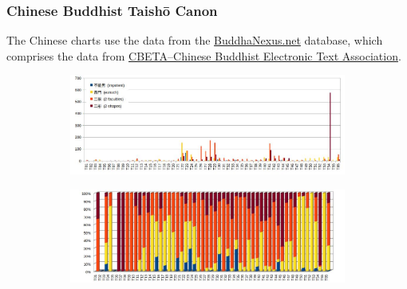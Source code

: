 \newpage
\subsubsection*{Chinese Buddhist Taishō Canon}

The Chinese charts use the data from the \href{https://buddhanexus.net}{BuddhaNexus.net} database, which comprises the data from \href{https://www.cbeta.org/}{CBETA--Chinese Buddhist Electronic Text Association}.

\begin{figure}[!h]
  \begin{subfigure}{\linewidth}
    \begin{center}
    \includegraphics[width=0.9\linewidth]{chinese.jpg}
    \end{center}
  \end{subfigure}
\setcounter{figure}{6}
\label{chinese1}
\end{figure}

\begin{figure}[!h]
  \begin{subfigure}{\linewidth}
  \begin{center}
    \includegraphics[width=0.98\linewidth]{chinese_perc.jpg}
  \end{center}
  \end{subfigure}
\setcounter{figure}{7}
\label{chinese2}
\end{figure}

\newpage
